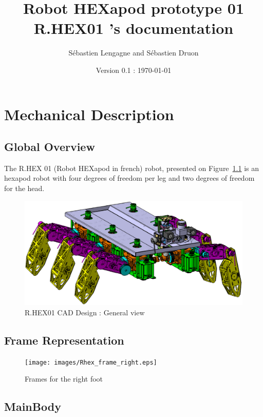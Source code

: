 \documentclass[a4paper,12pt]{report}
\title{Robot HEXapod prototype 01 \\ R.HEX01 's documentation}
\author{Sébastien Lengagne and  Sébastien Druon}
\date{Version 0.1 : \today}
\begin{document}
\maketitle

\begin{abstract}
\end{abstract}

\tableofcontents
\listoffigures
\listoftables

\chapter{Mechanical Description}
\minitoc
\section{Global Overview}
The R.HEX 01 (Robot HEXapod in french) robot, presented on Figure~\ref{fig_rhex} is an hexapod robot with four degrees of 
freedom per leg and two degrees of freedom for the head.

\begin{figure}[!htb]
\centering
\includegraphics[width = 0.9\columnwidth ]{images/rhex.eps}	
\caption{R.HEX01 CAD Design : General view}
\label{fig_rhex}
\end{figure}

\section{Frame Representation}
\begin{figure}[!htb]
\centering
\texttt{[image: images/Rhex\_frame\_right.eps]}	
\caption{Frames for the right foot}
\label{fig_frame_right}
\end{figure}

\newpage
\section{MainBody}
\end{document}
